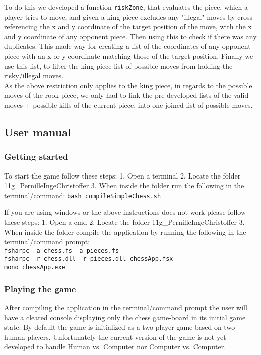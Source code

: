 \documentclass[a4paper]{report}
\begin{document}
To do this we developed a function \texttt{riskZone}, that evaluates the piece, which a player tries to move, and given a king piece excludes any "illegal" moves by cross-referencing the x and y coordinate of the target position of the move, with the x and y coordinate of any opponent piece. Then using this to check if there was any duplicates. This made way for creating a list of the coordinates of any opponent piece with an x or y coordinate matching those of the target position. Finally we use this list, to filter the king piece list of possible moves from holding the risky/illegal moves.\\

As the above restriction only applies to the king piece, in regards to the possible moves of the rook piece, we only had to link the pre-developed lists of the valid moves + possible kills of the current piece, into one joined list of possible moves.

\subsection*{User manual}

\subsubsection*{Getting started}

To start the game follow these steps:
1. Open a terminal
2. Locate the folder 11g\_PernilleIngeChristoffer
3. When inside the folder run the following in the terminal/command: \texttt{bash compileSimpleChess.sh}

If you are using windows or the above instructions does not work please follow these steps:
1. Open a cmd
2. Locate the folder  11g\_PernilleIngeChristoffer
3. When inside the folder compile the application by running the following in the terminal/command prompt:\\
\texttt{fsharpc -a chess.fs -a pieces.fs}\\
\texttt{fsharpc -r chess.dll -r pieces.dll chessApp.fsx}\\
\texttt{mono chessApp.exe}

\subsubsection*{Playing the game}

After compiling the application in the terminal/command prompt the user will have a cleared console displaying only the chess game-board in its initial game state.
By default the game is initialized as a two-player game based on two human players. Unfortunately the current version of the game is not yet developed to handle Human vs. Computer nor Computer vs. Computer.
\end{document}
